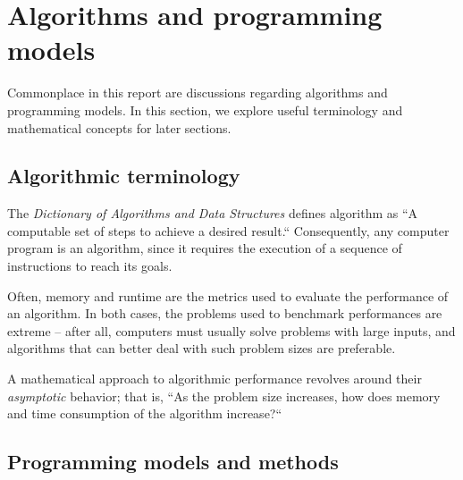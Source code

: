 \section{Algorithms and programming models}

Commonplace in this report are discussions regarding algorithms and programming models. In this section, we explore useful terminology and mathematical concepts for later sections.

\subsection{Algorithmic terminology}

The \emph{Dictionary of Algorithms and Data Structures} \cite{BLACK2021} defines algorithm as ``A computable set of steps to achieve a desired result.`` Consequently, any computer program is an algorithm, since it requires the execution of a sequence of instructions to reach its goals.

Often, memory and runtime are the metrics used to evaluate the performance of an algorithm. In both cases, the problems used to benchmark performances are extreme -- after all, computers must usually solve problems with large inputs, and algorithms that can better deal with such problem sizes are preferable.

A mathematical approach to algorithmic performance revolves around their \emph{asymptotic} behavior; that is, ``As the problem size increases, how does memory and time consumption of the algorithm increase?``



\subsection{Programming models and methods}